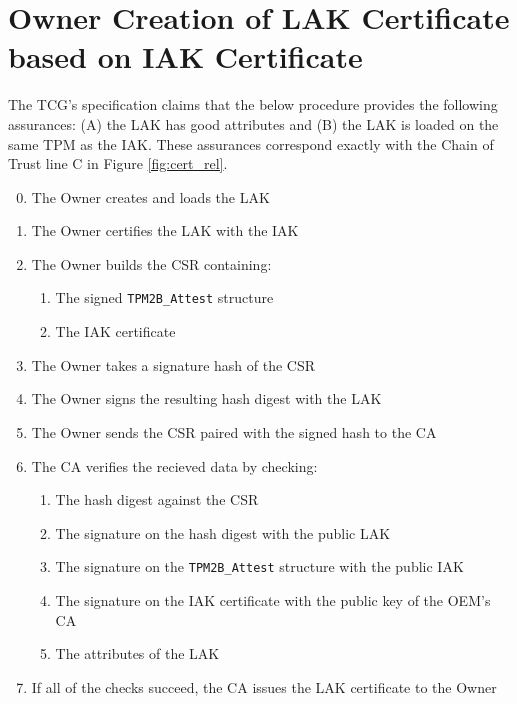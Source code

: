 \section{Owner Creation of LAK Certificate based on IAK Certificate}

The TCG's specification claims that the below procedure provides the following assurances: (A) the LAK has good attributes and (B) the LAK is  loaded on the same TPM as the IAK. These assurances correspond exactly with the Chain of Trust line C in Figure \ref{fig:cert_rel}. 
\begin{enumerate}[itemsep=0pt,parsep=0pt,partopsep=0pt]
  \setcounter{enumi}{-1}
  \item The Owner creates and loads the LAK
  \item The Owner certifies the LAK with the IAK
  \item The Owner builds the CSR containing:
  \begin{enumerate}[topsep=0pt, itemsep=0pt,parsep=0pt,partopsep=0pt]
    \item The signed \verb|TPM2B_Attest| structure
    \item The IAK certificate
  \end{enumerate}
  \item The Owner takes a signature hash of the CSR
  \item The Owner signs the resulting hash digest with the LAK
  \item The Owner sends the CSR paired with the signed hash to the CA
  \item The CA verifies the recieved data by checking:
  \begin{enumerate}[topsep=0pt, itemsep=0pt,parsep=0pt,partopsep=0pt]
    \item The hash digest against the CSR
    \item The signature on the hash digest with the public LAK
    \item The signature on the \verb|TPM2B_Attest| structure with the public IAK
    \item The signature on the IAK certificate with the public key of the OEM's CA
    \item The attributes of the LAK
  \end{enumerate}
  \item If all of the checks succeed, the CA issues the LAK certificate to the Owner
\end{enumerate}


